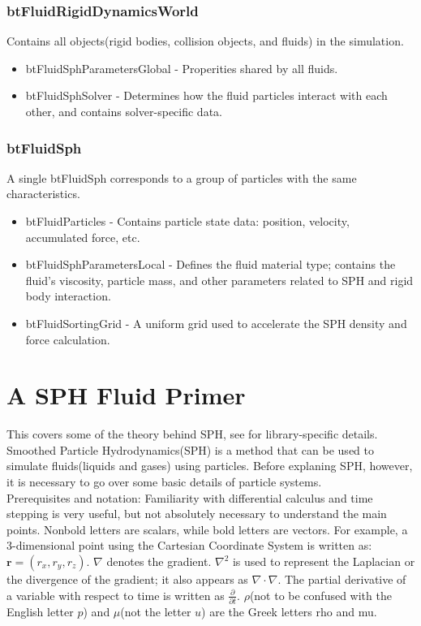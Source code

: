 \documentclass[]{article}
\begin{document}
		\subsubsection{btFluidRigidDynamicsWorld}
			Contains all objects(rigid bodies, collision objects, and fluids) in the simulation.
			\begin{itemize}
				\item btFluidSphParametersGlobal - Properities shared by all fluids.
				\item btFluidSphSolver - Determines how the fluid particles interact with each other, and contains solver-specific data.
			\end{itemize}
			
		\subsubsection{btFluidSph}
			A single btFluidSph corresponds to a group of particles with the same characteristics.
			\begin{itemize}
				\item btFluidParticles - Contains particle state data: position, velocity, accumulated force, etc.
				\item btFluidSphParametersLocal - Defines the fluid material type; contains the fluid's viscosity, 
				particle mass, and other parameters related to SPH and rigid body interaction.
				\item btFluidSortingGrid - A uniform grid used to accelerate the SPH density and force calculation.
			\end{itemize}
			
\pagebreak
\section{A SPH Fluid Primer}
	
	This covers some of the theory behind SPH, see  for library-specific details.\\
	
	Smoothed Particle Hydrodynamics(SPH) is a method that can be used to simulate fluids(liquids and gases) using 
	particles. Before explaning SPH, however, it is necessary to go over some basic details of particle systems.\\
	
	Prerequisites and notation: Familiarity with differential calculus and time stepping is very useful, but not 
	absolutely necessary to understand the main points. Nonbold letters are scalars, while bold letters are vectors. 
	For example, a 3-dimensional point using the Cartesian Coordinate System is written as: 
	\( \mathbf{r} = (r_x, r_y, r_z) \). \( \nabla \) denotes the gradient. \(\nabla ^2\) is used to represent the 
	Laplacian or the divergence of the gradient; it also appears as \(\nabla \cdot \nabla\). The partial derivative of 
	a variable with respect to time is written as \( \frac{\partial}{\partial t} \). \(\rho\)(not to be confused with the
	English letter \(p\)) and \(\mu\)(not the letter \(u\)) are the Greek letters rho and mu.\\
	
\end{document}

